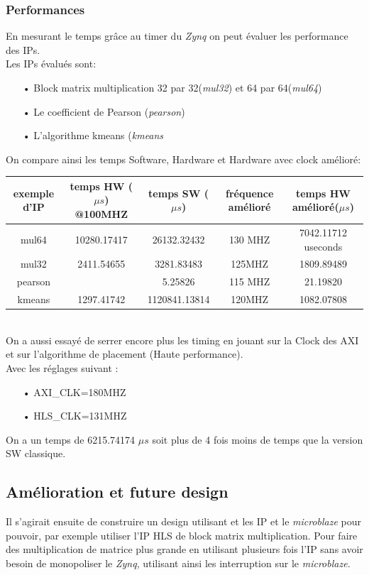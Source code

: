 \documentclass[12pt,a4paper]{article}
\begin{document}
\subsubsection{Performances}
En mesurant le temps grâce au timer du \textit{Zynq} on peut évaluer les performance des IPs.\\
Les IPs évalués sont: \begin{itemize}
\item[•]Block matrix multiplication 32 par 32(\textit{mul32}) et 64 par 64(\textit{mul64})
\item[•]Le coefficient de Pearson (\textit{pearson})
\item[•]L'algorithme kmeans (\textit{kmeans}
\end{itemize}
\bigskip
On compare ainsi les temps Software, Hardware et Hardware avec clock amélioré:\\
\bigskip
\begin{tabular}{|c|c|c|c|c|}

\hline
\scriptsize exemple d'IP & \scriptsize temps HW ($\mu s$) @100MHZ &\scriptsize temps SW ($\mu s$) &\scriptsize fréquence amélioré&\scriptsize temps HW amélioré($\mu s$) \\
\hline
mul64 & 10280.17417 & 26132.32432 & 130 MHZ & 7042.11712 useconds\\
mul32&2411.54655  & 3281.83483& 125MHZ & 1809.89489\\
pearson&  &5.25826 &115 MHZ &21.19820\\
kmeans&1297.41742 & 1120841.13814 &120MHZ &1082.07808\\
\hline
\end{tabular}\\
\bigskip
On a aussi essayé de serrer encore plus les timing en jouant sur la Clock des AXI et sur l'algorithme de placement (Haute performance).\\
Avec les réglages suivant : \begin{itemize}
\item[•]AXI\_CLK=180MHZ
\item[•]HLS\_CLK=131MHZ
\end{itemize}
On a un temps de 6215.74174 $\mu s$ soit plus de 4 fois moins de temps que la version SW classique.


\subsection{Amélioration et future design}
Il s'agirait ensuite de construire un design utilisant et les IP et le \textit{microblaze} pour pouvoir, par exemple utiliser l'IP HLS de block matrix multiplication. Pour faire des multiplication de matrice plus grande en utilisant plusieurs fois l'IP sans avoir besoin de monopoliser le \textit{Zynq}, utilisant ainsi les interruption sur le \textit{microblaze.}

\end{document}

